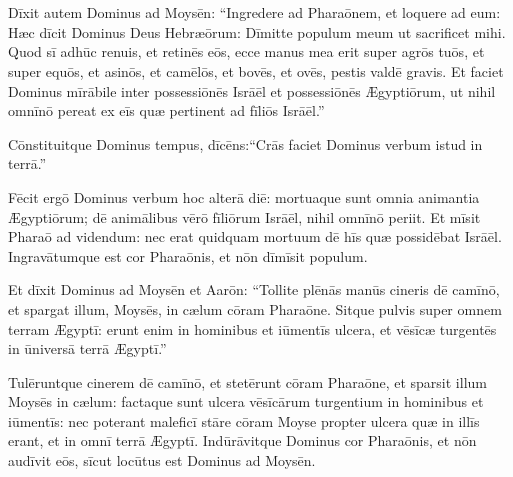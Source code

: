 \chapter{}


\thispagestyle{empty}

Dīxit autem Dominus ad Moysēn: ``Ingre\-dere ad Pharaōnem, et loquere ad eum: Hæc dīcit
Dominus Deus Hebræōrum: Dīmitte populum meum ut
sacrificet mihi.  Quod sī adhūc renuis, et retinēs
eōs,  ecce manus mea erit super agrōs tuōs, et super equōs, et asinōs, et
camēlōs, et bovēs, et ovēs, pestis valdē gravis.  Et faciet Dominus mīrābile
inter possessiōnēs Isrāēl et possessiōnēs
Ægyptiōrum, ut nihil omnīnō pereat ex eīs quæ
pertinent ad fīliōs Isrāēl.''

Cōnstituitque Dominus tempus, dīcēns:\linebreak``Crās faciet Dominus verbum istud in
terrā.'' 

Fēcit ergō Dominus verbum hoc
alterā diē: mortuaque sunt omnia animantia Ægyptiōrum; dē animālibus vērō
fīliōrum Isrāēl, nihil omnīnō periit.  Et mīsit Pharaō ad
videndum: nec erat quidquam mortuum dē hīs quæ possidēbat Isrāēl.
Ingravātumque est cor
Pharaōnis, et nōn dīmīsit populum.

Et dīxit Dominus ad
Moysēn et Aarōn: ``Tollite plēnās manūs cineris dē
camīnō, et spargat illum, Moysēs, in cælum
cōram Pharaōne.  Sitque pulvis super omnem terram Æ\-gyptī: erunt enim in hominibus et
iūmentīs ulcera, et vēsīcæ
turgentēs in ūniversā terrā Ægyptī.''

Tulēruntque
cinerem dē camīnō, et stetērunt cōram Pharaōne, et sparsit
illum Moysēs in cælum: factaque sunt ulcera vēsīcārum
turgentium in hominibus et iūmentīs:  nec poterant
maleficī stāre cōram Moyse propter ulcera quæ in illīs
erant, et in omnī terrā Ægyptī.  Indūrāvitque Dominus cor Pharaōnis, et nōn audīvit eōs, sīcut
locūtus est Dominus ad Moysēn.

